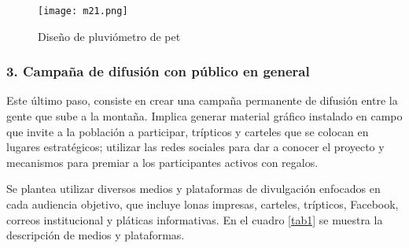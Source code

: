 \begin{figure}[h!]
\centering
  \texttt{[image: m21.png]}
  \caption{Diseño de pluviómetro de pet}
  \label{m21}
\end{figure}






\newpage
\subsubsection{3. Campaña de difusión con público en general}

Este último paso, consiste en crear una campaña permanente de difusión entre la gente que sube a la montaña. Implica generar material gráfico instalado en campo que invite a la población a participar, trípticos y carteles que se colocan en lugares estratégicos;  utilizar las redes sociales para dar a conocer el proyecto y mecanismos para premiar a los participantes activos con regalos. 


Se plantea utilizar diversos medios y plataformas de divulgación enfocados en cada audiencia objetivo, que incluye lonas impresas, carteles, trípticos, Facebook, correos institucional y pláticas informativas. En el cuadro \ref{tab1} se muestra la descripción de medios y plataformas.


